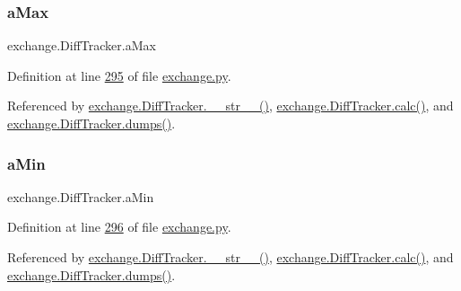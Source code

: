 \mbox{\label{classexchange_1_1_diff_tracker_a3dcbc689ebb5ec6e0c8e600079d95de9}} 
\subsubsection{\texorpdfstring{a\+Max}{aMax}}
{\footnotesize\ttfamily exchange.\+Diff\+Tracker.\+a\+Max}



Definition at line \hyperlink{exchange_8py_source_l00295}{295} of file \hyperlink{exchange_8py_source}{exchange.\+py}.



Referenced by \hyperlink{exchange_8py_source_l00336}{exchange.\+Diff\+Tracker.\+\_\+\+\_\+str\+\_\+\+\_\+()}, \hyperlink{exchange_8py_source_l00309}{exchange.\+Diff\+Tracker.\+calc()}, and \hyperlink{exchange_8py_source_l00385}{exchange.\+Diff\+Tracker.\+dumps()}.

\mbox{\label{classexchange_1_1_diff_tracker_a65d042348359fa27a17e092e66405ae7}} 
\subsubsection{\texorpdfstring{a\+Min}{aMin}}
{\footnotesize\ttfamily exchange.\+Diff\+Tracker.\+a\+Min}



Definition at line \hyperlink{exchange_8py_source_l00296}{296} of file \hyperlink{exchange_8py_source}{exchange.\+py}.



Referenced by \hyperlink{exchange_8py_source_l00336}{exchange.\+Diff\+Tracker.\+\_\+\+\_\+str\+\_\+\+\_\+()}, \hyperlink{exchange_8py_source_l00309}{exchange.\+Diff\+Tracker.\+calc()}, and \hyperlink{exchange_8py_source_l00385}{exchange.\+Diff\+Tracker.\+dumps()}.

\mbox{\label{classexchange_1_1_diff_tracker_a6adc6f18dd9b5d2d8ea8978235cb569d}} 

